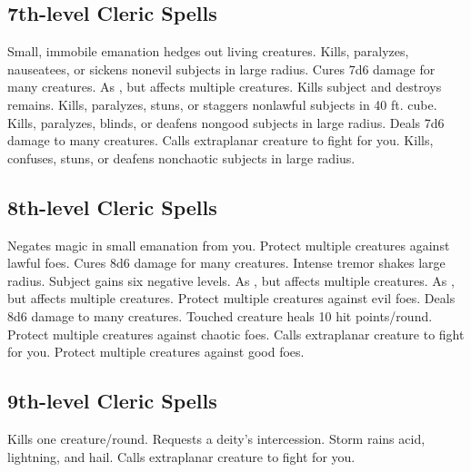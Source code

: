\subsection{7th-level Cleric Spells}
\begin{spelllist}
   Small, immobile emanation hedges out living creatures.
   Kills, paralyzes, nauseatees, or sickens nonevil subjects in large radius.
   Cures 7d6 damage for many creatures.
   As , but affects multiple creatures.
  \F Kills subject and destroys remains.
   Kills, paralyzes, stuns, or staggers nonlawful subjects in 40 ft. cube.
   Kills, paralyzes, blinds, or deafens nongood subjects in large radius.
   Deals 7d6 damage to many creatures.
   Calls extraplanar creature to fight for you.
   Kills, confuses, stuns, or deafens nonchaotic subjects in large radius.
\end{spelllist}

\subsection{8th-level Cleric Spells}
\begin{spelllist}
   Negates magic in small emanation from you.
  \F Protect multiple creatures against lawful foes. 
   Cures 8d6 damage for many creatures.
   Intense tremor shakes large radius.
   Subject gains six negative levels.
   As , but affects multiple creatures.
   As , but affects multiple creatures.
  \F Protect multiple creatures against evil foes. 
   Deals 8d6 damage to many creatures.
   Touched creature heals 10 hit points/round.
  \F Protect multiple creatures against chaotic foes. 
   Calls extraplanar creature to fight for you.
  \F Protect multiple creatures against good foes. 
\end{spelllist}

\subsection{9th-level Cleric Spells}
\begin{spelllist}
   Kills one creature/round.
  \M Requests a deity's intercession.
   Storm rains acid, lightning, and hail.
   Calls extraplanar creature to fight for you.
\end{spelllist}

